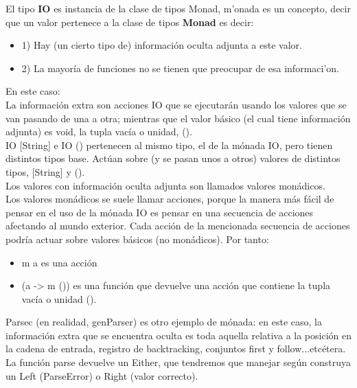 El tipo \textbf{IO} es instancia de la clase de tipos Monad, m'onada es un concepto, decir que un valor pertenece a la clase de tipos \textbf{Monad} es decir:\\

\begin{itemize}
  \item 1) Hay (un cierto tipo de) informaci\'on oculta adjunta a este valor.
  \item 2) La mayor\'ia de funciones no se tienen que preocupar de esa informaci'on.
\end{itemize}

En este caso:\\

La informaci\'on extra son acciones IO que se ejecutar\'an usando los valores que se van pasando de una a otra; mientras que el valor b\'asico (el cual tiene informaci\'on adjunta) es void, la tupla vac\'ia o unidad, ().\\

IO [String] e IO () pertenecen al mismo tipo, el de la m\'onada IO, pero tienen distintos tipos base. Act\'uan sobre (y se pasan unos a otros) valores de distintos tipos, [String] y ().\\

Los valores con informaci\'on oculta adjunta son llamados valores mon\'adicos.\\

Los valores mon\'adicos se suele llamar acciones, porque la manera m\'as f\'acil de pensar en el uso de la m\'onada IO es pensar en una secuencia de acciones afectando al mundo exterior. Cada acci\'on de la mencionada secuencia de acciones podr\'ia actuar sobre valores b\'asicos (no mon\'adicos). Por tanto:\\

\begin{itemize}
  \item m a es una acci\'on
  \item (a -> m ()) es una funci\'on que devuelve una acci\'on que contiene la tupla vac\'ia o unidad ().
\end{itemize}

Parsec (en realidad, genParser) es otro ejemplo de m\'onada: en este caso, la informaci\'on extra que se encuentra oculta es toda aquella relativa a la posici\'on en la cadena de entrada, registro de backtracking, conjuntos first y follow...etc\'etera.\\

La funci\'on parse devuelve un Either, que tendremos que manejar seg\'un construya un Left (ParseError) o Right (valor correcto).\\

